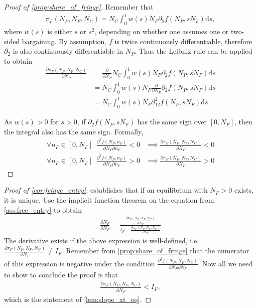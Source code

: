 \documentclass[a4paper]{article}
\newcommand{\ds}{\mathrm{d}s}
\begin{document}
\begin{proof}[Proof of \cref{prop:share_of_fringe}]
    Remember that
    \begin{align*}
        \pi_F(N_P, N_F, N_C) = N_C \int_0^1 w(s) N_F \partial_2 f(N_P, s N_F) \ds,
    \end{align*}
    where $w(s)$ is either $s$ or $s^2$, depending on whether one assumes one or two-sided bargaining.
    By assumption, $f$ is twice continuously differentiable, therefore $\partial_2$ is also continuously differentiable in $N_P$.
    Thus the Leibniz rule can be applied to obtain
    \begin{align*}
        \frac{\partial \pi_F(N_P, N_F, N_C)}{\partial N_P} &= \frac{\partial}{\partial N_P} N_C \int_0^1 w(s) N_F \partial_2 f(N_P, s N_F) \ds \\
        &= N_C \int_0^1 w(s) N_F \frac{\partial}{\partial N_P} \partial_2 f(N_P, s N_F) \ds \\
        &= N_C \int_0^1 w(s) N_F \partial^2_{12} f(N_P, s N_F) \ds.
    \end{align*}

    As $w(s) > 0$ for $s > 0$, if $\partial_2 f(N_P, s N_F)$ has the same sign over $[0, N_F]$, then the integral also has the same sign.
    Formally,
    \begin{align*}
        \forall n_F \in [0, N_F] \enspace \frac{\partial^2 f(N_P, n_F)}{\partial N_P \partial n_F} < 0 &\implies \frac{\partial \pi_F(N_P, N_F, N_C)}{\partial N_P} < 0 \\
        \forall n_F \in [0, N_F] \enspace \frac{\partial^2 f(N_P, n_F)}{\partial N_P \partial n_F} > 0 &\implies \frac{\partial \pi_F(N_P, N_F, N_C)}{\partial N_P} > 0
    \end{align*}
\end{proof}

\begin{proof}[Proof of \cref{cor:fringe_entry}]
     establishes that if an equilibrium with $N_F > 0$ exists, it is unique.
    Use the implicit function theorem on the equation from \cref{ass:free_entry} to obtain
    \begin{align*}
        \frac{\partial N_F}{\partial N_P} = \frac{\frac{\partial \pi_F(N_P, N_F, N_C)}{\partial N_P}}{I_F - \frac{\partial \pi_F (N_P, N_F, N_C)}{\partial N_F}}
    \end{align*}
    The derivative exists if the above expression is well-defined, i.e. $\frac{\partial \pi_F (N_P, N_F, N_C)}{\partial N_F} \neq I_F$.
    Remember from \cref{prop:share_of_fringe} that the numerator of this expression is negative under the condition $\frac{\partial^2 f(N_P, N_F, N_C)}{\partial N_P \partial N_F}$.
    Now all we need to show to conclude the proof is that
    \begin{align*}
        \frac{\partial \pi_F (N_P, N_F, N_C)}{\partial N_F} < I_F,
    \end{align*}
    which is the statement of \cref{lem:slope_at_eq}.
\end{proof}
\end{document}
